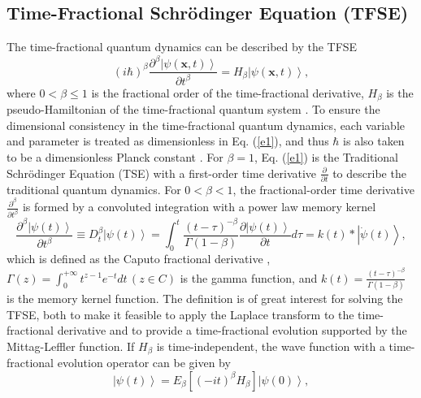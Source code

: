 \documentclass[
showpacs,  %
showkeys,  %
aps,       %
amsthm,    %
amsmath,   %
amsfonts,  %
amssymb    %
]{revtex4-1}          %
\begin{document}
\subsection{Time-Fractional Schr\"{o}dinger Equation (TFSE)}
\label{Subsec:21}
The time-fractional quantum dynamics can be described by the TFSE
\begin{equation}
\label{e1}
{(i\hbar )^\beta }\frac{{{\partial ^\beta }\left| {\psi (\boldsymbol{x},t)} \right\rangle }}{{\partial {t^\beta }}} = {H_\beta }\left| {\psi (\boldsymbol{x},t)} \right\rangle,
\end{equation}
where $0<\beta\leq1$ is the fractional order of the time-fractional derivative, ${H_\beta}$ is the pseudo-Hamiltonian of the time-fractional quantum system \cite{Dong2008}. To ensure the dimensional consistency in the time-fractional quantum dynamics, each variable and parameter is treated as dimensionless in Eq. (\ref{e1}), and thus $\hbar$ is also taken to be a dimensionless Planck constant \cite{Naber2004,Dong2008}. For $\beta=1$, Eq. (\ref{e1}) is the Traditional Schr\"{o}dinger Equation (TSE) with a first-order time derivative $\frac{\partial }{{\partial t}}$ to describe the traditional quantum dynamics. For $0<\beta<1$, the fractional-order time derivative $\frac{{{\partial ^\beta }}}{{\partial {t^\beta }}}$ is formed by a convoluted integration with a power law memory kernel \cite{Iomin2009}
\begin{equation}
\label{e2}
\frac{{{\partial ^\beta }\left| {\psi (t)} \right\rangle }}{{\partial {t^\beta }}} \equiv D_t^\beta \left| {\psi (t)} \right\rangle  = \int_0^t {\frac{{{{(t - \tau )}^{ - \beta }}}}{{\Gamma (1 - \beta )}}} \frac{{\partial \left| {\psi (t)} \right\rangle }}{{\partial t}}d\tau  = k(t) * \left| {\dot \psi (t)} \right\rangle,
\end{equation}
which is defined as the Caputo fractional derivative \cite{Iomin2009}, $\Gamma (z) = \int_0^{ + \infty } {{t^{z - 1}}} {e^{ - t}}dt\,(z \in C)$ is the gamma function, and $k(t) = \frac{{{{(t - \tau )}^{ - \beta }}}}{{\Gamma (1 - \beta )}}$ is the memory kernel function. The definition is of great interest for solving the TFSE, both to make it feasible to apply the Laplace transform to the time-fractional derivative and to provide a time-fractional evolution supported by the Mittag-Leffler function. If ${H_\beta}$ is time-independent, the wave function with a time-fractional evolution operator can be given by \cite{Iomin2009}
\begin{equation}
\label{e3}
\left| {\psi (t)} \right\rangle  = {E_\beta }\left[ {{{( - it)}^\beta }{H_\beta }} \right]\left| {\psi (0)} \right\rangle,
\end{equation}
\end{document}
